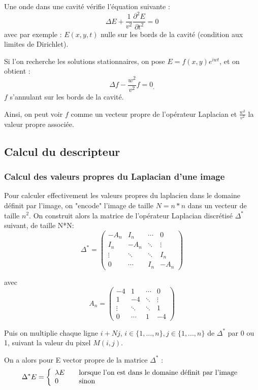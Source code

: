 \documentclass[a4paper,10pt]{article} %
\theoremstyle{definition} %
\begin{document}
Une onde dans une cavité vérifie l'équation suivante : $$\Delta E + \frac{1}{v^2} \frac{\partial^2 E}{\partial t^2} = 0$$ avec par exemple : $E(x,y,t)$ nulle sur les bords de la cavité (condition aux limites de Dirichlet).

Si l'on recherche les solutions stationnaires, on pose $E = f(x,y)e^{iwt}$, et on obtient : 
$$ \Delta f  - \frac{w^2}{v^2} f  = 0 _, $$$f$ s'annulant sur les bords de la cavité.

Ainsi, on peut voir $f$ comme un vecteur propre de l'opérateur Laplacian et $\frac{w^2}{v^2}$ la valeur propre associée.

\subsection*{Calcul du descripteur}

\subsubsection*{Calcul des valeurs propres du Laplacian d'une image}

Pour calculer effectivement les valeurs propres du laplacien dans le domaine définit par l'image, on "encode" l'image de taille $N = n*n$ dans un vecteur de taille $n^2$.
On construit alors la matrice de l'opérateur Laplacian discrétisé $\Delta^*$ suivant, de taille N*N: 
$$
\Delta^* =
 \begin{pmatrix}
  -A_n & I_n & \cdots & 0 \\
  I_n & -A_n & \ddots &   \vdots \\
  \vdots  & \ddots  & \ddots & I_n  \\
  0 & \cdots  & I_n & -A_n
 \end{pmatrix}
$$

avec $$A_n =  
\begin{pmatrix}
  -4 & 1 & \cdots & 0 \\
  1  & -4 & \ddots &   \vdots \\
  \vdots  & \ddots  & \ddots & 1  \\
  0 & \cdots  & 1 & -4
 \end{pmatrix}  $$

Puis on multiplie chaque ligne $i+Nj$, $i \in \{1, ..., n\}, j \in \{1, ..., n\}$ de $\Delta^*$ par 0 ou 1, suivant la valeur du pixel $M(i,j)$.

On a alors pour E vector propre de la matrice  $\Delta^*$ : 
\[ \Delta^* E = \left\{ 
  \begin{array}{l l}
    \lambda E & \quad \text{lorsque l'on est dans le domaine définit par l'image}\\
    0 & \quad \text{sinon}
  \end{array} \right.\]
  
\end{document}
